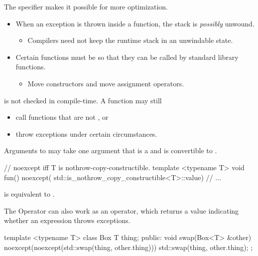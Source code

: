 \documentclass{beamer}
\begin{document}
\begin{frame}{}
    The  specifier makes it possible for more optimization.
    \begin{itemize}
        \item When an exception is thrown inside a  function, the stack is \textit{possibly} unwound.
        \begin{itemize}
            \item Compilers need not keep the runtime stack in an unwindable state.
        \end{itemize}
        \item Certain functions must be  so that they can be called by standard library functions.
        \begin{itemize}
            \item Move constructors and move assignment operators.
        \end{itemize}
    \end{itemize}
\end{frame}

\begin{frame}{}
     is not checked in compile-time. A  function may still
    \begin{itemize}
        \item call functions that are not , or
        \item throw exceptions under certain circumstances.
    \end{itemize}
\end{frame}

\begin{frame}[fragile]{Arguments to }
     may take one argument that is a  and is convertible to .
    \begin{cpp}
// noexcept iff T is nothrow-copy-constructible.
template <typename T>
void fun() noexcept(
    std::is_nothrow_copy_constructible<T>::value) {
  // ...
}
    \end{cpp}
     is equivalent to \ttt{(}\ttt{)}.
\end{frame}

\begin{frame}[fragile]{The  Operator}
     can also work as an operator, which returns a  value indicating whether an expression throws exceptions.
    \begin{cpp}
template <typename T>
class Box {
  T thing;
 public:
  void swap(Box<T> &other)
      noexcept(noexcept(std::swap(thing, other.thing)))
  {
    std::swap(thing, other.thing);
  }
};
    \end{cpp}
\end{frame}
\end{document}
